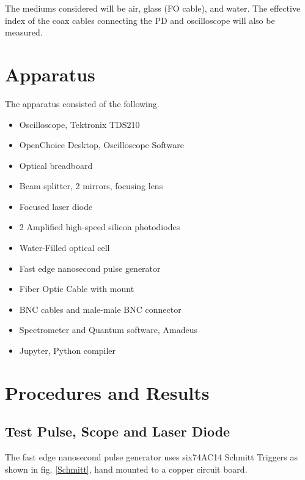 \documentclass[aps,prl,reprint]{revtex4-2}
\begin{document}
The mediums considered will be air, glass (FO cable), and water. The effective 
index of the coax cables connecting the PD and oscilloscope will also be measured.


\section{Apparatus}

The apparatus consisted of the following.
\begin{itemize}
\item Oscilloscope, Tektronix TDS210
\item OpenChoice Desktop, Oscilloscope Software
\item Optical breadboard
\item Beam splitter, 2 mirrors, focusing lens
\item Focused laser diode
\item 2 Amplified high-speed silicon photodiodes
\item Water-Filled optical cell
\item Fast edge nanosecond pulse generator
\item Fiber Optic Cable with mount
\item BNC cables and male-male BNC connector
\item Spectrometer and Quantum software, Amadeus
\item Jupyter, Python compiler
\end{itemize}

\section{Procedures and Results}

\subsection{Test Pulse, Scope and Laser Diode}
The  fast  edge  nanosecond  pulse  generator  uses  six74AC14 Schmitt Triggers as shown 
in fig. \ref{Schmitt}, hand mounted to a copper circuit board.\\
\end{document}
